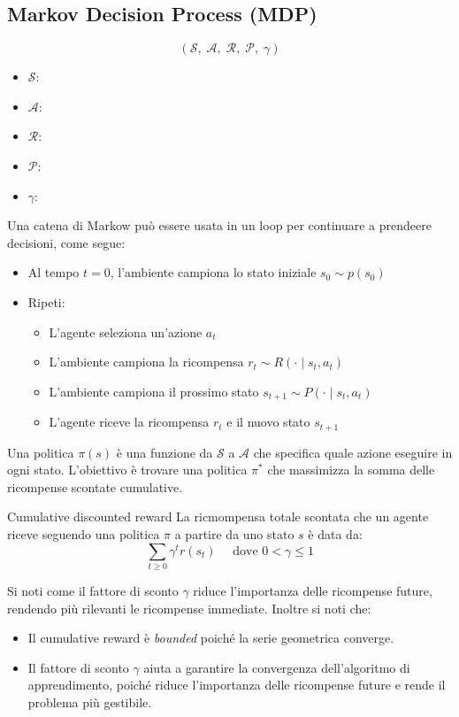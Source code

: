 \subsection{Markov Decision Process (MDP)}

\[
	(\mathcal{S},\; \mathcal{A},\; \mathcal{R},\; \mathcal{P},\; \gamma)
\]

\begin{itemize}
	\item $\mathcal{S}$: 
	\item $\mathcal{A}$: 
	\item $\mathcal{R}$: 
	\item $\mathcal{P}$: 
	\item $\gamma$: 
\end{itemize}
Una catena di Markow può essere usata in un loop per continuare a prendeere decisioni, come segue:

\begin{itemize}
	\item Al tempo $t=0$, l'ambiente campiona lo stato iniziale $s_0 \sim p(s_0)$
	\item Ripeti:
	      \begin{itemize}
		      \item L'agente seleziona un'azione $a_t$
		      \item L'ambiente campiona la ricompensa $r_t \sim R(\cdot \mid s_t, a_t)$
		      \item L'ambiente campiona il prossimo stato $s_{t+1} \sim P(\cdot \mid s_t, a_t)$
		      \item L'agente riceve la ricompensa $r_t$ e il nuovo stato $s_{t+1}$
	      \end{itemize}
\end{itemize}

Una politica $\pi(s)$ è una funzione da $\mathcal{S}$ a $\mathcal{A}$ che specifica quale azione eseguire in ogni stato. L'obiettivo è trovare una politica $\pi^*$ che massimizza la somma delle ricompense scontate cumulative.
\begin{definizione}{Cumulative discounted reward}
	La ricmompensa totale scontata che un agente riceve seguendo una politica $\pi$ a partire da uno stato $s$ è data da:
	\[
		\sum_{t \ge 0} \gamma^t r\left(s_t\right) \quad \text{ dove } 0 < \gamma \le 1
	\]
\end{definizione}
Si noti come il fattore di sconto $\gamma$ riduce l'importanza delle ricompense future, rendendo più rilevanti le ricompense immediate. Inoltre si noti che:
\begin{itemize}
	\item Il cumulative reward è \textit{bounded} poiché la serie geometrica converge.
	\item Il fattore di sconto $\gamma$ aiuta a garantire la convergenza dell'algoritmo di apprendimento, poiché riduce l'importanza delle ricompense future e rende il problema più gestibile.
\end{itemize}

